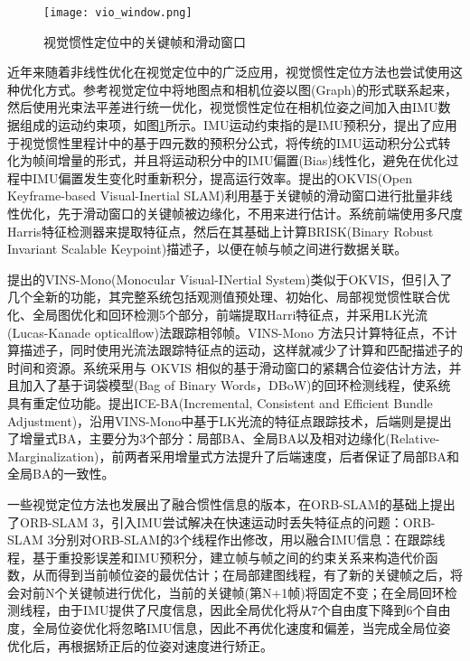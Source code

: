 \begin{figure}
  \centering
  \texttt{[image: vio\_window.png]}
  \caption{视觉惯性定位中的关键帧和滑动窗口}
  \label{fig:vio_window}
\end{figure}

近年来随着非线性优化在视觉定位中的广泛应用，视觉惯性定位方法也尝试使用这种优化方式。参考视觉定位中将地图点和相机位姿以图(Graph)的形式联系起来，然后使用光束法平差进行统一优化，视觉惯性定位在相机位姿之间加入由IMU数据组成的运动约束项，如图\ref{fig:vio_window}所示。IMU运动约束指的是IMU预积分，\citet{forster2016manifold}提出了应用于视觉惯性里程计中的基于四元数的预积分公式，将传统的IMU运动积分公式转化为帧间增量的形式，并且将运动积分中的IMU偏置(Bias)线性化，避免在优化过程中IMU偏置发生变化时重新积分，提高运行效率。\citet{leutenegger2015keyframe}提出的OKVIS(Open Keyframe-based Visual-Inertial SLAM)利用基于关键帧的滑动窗口进行批量非线性优化，先于滑动窗口的关键帧被边缘化，不用来进行估计。系统前端使用多尺度Harris\cite{harris1988combined}特征检测器来提取特征点，然后在其基础上计算BRISK(Binary Robust Invariant Scalable Keypoint)\cite{leutenegger2011brisk}描述子，以便在帧与帧之间进行数据关联。

\citet{qin2018vins}提出的VINS-Mono(Monocular Visual-INertial System)类似于OKVIS，但引入了几个全新的功能，其完整系统包括观测值预处理、初始化、局部视觉惯性联合优化、全局图优化和回环检测5个部分，前端提取Harri特征点，并采用LK光流(Lucas-Kanade opticalflow)\cite{lucas1981iterative}法跟踪相邻帧。VINS-Mono 方法只计算特征点，不计算描述子，同时使用光流法跟踪特征点的运动，这样就减少了计算和匹配描述子的时间和资源。系统采用与 OKVIS 相似的基于滑动窗口的紧耦合位姿估计方法，并且加入了基于词袋模型(Bag of Binary Words，DBoW)\cite{galvez2012bags}的回环检测线程，使系统具有重定位功能。\citet{liu2018ice}提出ICE-BA(Incremental, Consistent and Efficient Bundle Adjustment)，沿用VINS-Mono中基于LK光流的特征点跟踪技术，后端则是提出了增量式BA，主要分为3个部分：局部BA、全局BA以及相对边缘化(Relative-Marginalization)，前两者采用增量式方法提升了后端速度，后者保证了局部BA和全局BA的一致性。

一些视觉定位方法也发展出了融合惯性信息的版本，\citet{campos2021orb}在ORB-SLAM的基础上提出了ORB-SLAM 3，引入IMU尝试解决在快速运动时丢失特征点的问题：ORB-SLAM 3分别对ORB-SLAM的3个线程作出修改，用以融合IMU信息：在跟踪线程，基于重投影误差和IMU预积分，建立帧与帧之间的约束关系来构造代价函数，从而得到当前帧位姿的最优估计；在局部建图线程，有了新的关键帧之后，将会对前N个关键帧进行优化，当前的关键帧(第N+1帧)将固定不变；在全局回环检测线程，由于IMU提供了尺度信息，因此全局优化将从7个自由度下降到6个自由度，全局位姿优化将忽略IMU信息，因此不再优化速度和偏差，当完成全局位姿优化后，再根据矫正后的位姿对速度进行矫正。

